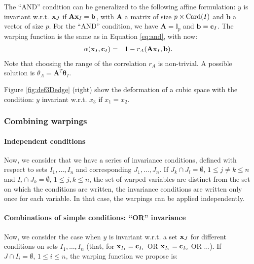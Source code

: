 The ``AND'' condition can be generalized to the following affine formulation: 
$y$ is invariant w.r.t. $\mathbf{x}_J$ if $\mathbf{A} \mathbf{x}_I = \mathbf{b}$, 
with $\mathbf{A}$ a matrix of size $p \times \operatorname{Card}(I)$ and $\mathbf{b}$ a vector of size $p$.
For the ``AND'' condition, we have $\mathbf{A} = \mathbb{I}_p$ and $\mathbf{b}=\mathbf{c}_I$.
The warping function is the same as in Equation \ref{eq:and}, with now:
\begin{eqnarray}
  \alpha(\mathbf{x}_I,  \mathbf{c}_I) &=& 1 - r_A(\mathbf{A} \mathbf{x}_I, \mathbf{b}).\label{eq:aff}
\end{eqnarray}
Note that choosing the range of the correlation $r_A$ is non-trivial. A possible solution is $\theta_A = \mathbf{A}^T \boldsymbol{\theta}_I$.

Figure \ref{fig:def3Dedge} (right) show the deformation of a cubic space with the condition: $y$ invariant w.r.t. $x_3$ if $x_1 = x_2$. 

\subsubsection{Combining warpings}

\paragraph{Independent conditions}
Now, we consider that we have a series of invariance conditions, defined with respect to sets $I_1, \ldots, I_n$ and corresponding $J_1, \ldots, J_n$.
If $J_k\cap J_l=\emptyset$, $1 \leq j\neq k \leq n$ and $I_i\cap J_k = \emptyset$,  $1 \leq j,k \leq n$,
the set of warped variables are distinct from the set on which the conditions are written, 
the invariance conditions are written only once for each variable. In that case, 
the warpings can be applied independently.

\paragraph{Combinations of simple conditions: ``OR'' invariance}
Now, we consider the case when $y$ is invariant w.r.t. a set $\mathbf{x}_J$ for different conditions on sets $I_1, \ldots, I_n$
(that, for $\mathbf{x}_{I_1}=\mathbf{c}_{I_1}$ OR $\mathbf{x}_{I_2}=\mathbf{c}_{I_2}$ OR $\ldots$).
If $J\cap I_i=\emptyset$, $1 \leq i \leq n$, the warping function we propose is:

